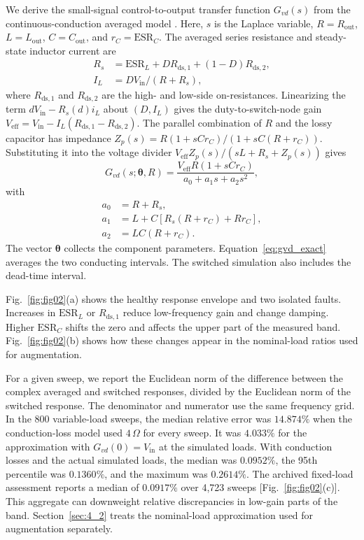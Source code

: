 \documentclass[journal]{IEEEtran}
\begin{document}
We derive the small-signal control-to-output transfer function $G_{vd}(s)$ from the continuous-conduction averaged model \cite{middlebrook1976general,erickson2001fundamentals}. Here, $s$ is the Laplace variable, $R=R_{\mathrm{out}}$, $L=L_{\mathrm{out}}$, $C=C_{\mathrm{out}}$, and $r_C=\mathrm{ESR}_C$. The averaged series resistance and steady-state inductor current are
\begin{align}
R_s &= \mathrm{ESR}_L + D R_{\mathrm{ds},1} + (1-D)R_{\mathrm{ds},2},\\
I_L &= DV_{\mathrm{in}}/(R+R_s),
\end{align}
where $R_{\mathrm{ds},1}$ and $R_{\mathrm{ds},2}$ are the high- and low-side on-resistances. Linearizing the term $dV_{\mathrm{in}}-R_s(d)i_L$ about $(D,I_L)$ gives the duty-to-switch-node gain $V_{\mathrm{eff}}=V_{\mathrm{in}}-I_L(R_{\mathrm{ds},1}-R_{\mathrm{ds},2})$. The parallel combination of $R$ and the lossy capacitor has impedance $Z_p(s)=R(1+sCr_C)/(1+sC(R+r_C))$. Substituting it into the voltage divider $V_{\mathrm{eff}} Z_p(s)/(sL+R_s+Z_p(s))$ gives
\begin{equation}
\label{eq:gvd_exact}
G_{vd}(s;\boldsymbol{\theta},R)
=\frac{V_{\mathrm{eff}} R(1+sCr_C)}
{a_0+a_1s+a_2s^2},
\end{equation}
with
\begin{align*}
a_0 &= R+R_s,\\
a_1 &= L+C[R_s(R+r_C)+Rr_C],\\
a_2 &= LC(R+r_C).
\end{align*}
The vector $\boldsymbol{\theta}$ collects the component parameters. Equation~\eqref{eq:gvd_exact} averages the two conducting intervals. The switched simulation also includes the dead-time interval.

Fig.~\ref{fig:fig02}(a) shows the healthy response envelope and two isolated faults. Increases in $\mathrm{ESR}_L$ or $R_{\mathrm{ds},1}$ reduce low-frequency gain and change damping. Higher $\mathrm{ESR}_C$ shifts the zero and affects the upper part of the measured band. Fig.~\ref{fig:fig02}(b) shows how these changes appear in the nominal-load ratios used for augmentation.

For a given sweep, we report the Euclidean norm of the difference between the complex averaged and switched responses, divided by the Euclidean norm of the switched response. The denominator and numerator use the same frequency grid. In the 800 variable-load sweeps, the median relative error was $14.874\%$ when the conduction-loss model used $4\,\Omega$ for every sweep. It was $4.033\%$ for the approximation with $G_{vd}(0)=V_{\mathrm{in}}$ at the simulated loads. With conduction losses and the actual simulated loads, the median was $0.0952\%$, the 95th percentile was $0.1360\%$, and the maximum was $0.2614\%$. The archived fixed-load assessment reports a median of $0.0917\%$ over 4,723 sweeps [Fig.~\ref{fig:fig02}(c)]. This aggregate can downweight relative discrepancies in low-gain parts of the band. Section~\ref{sec:4_2} treats the nominal-load approximation used for augmentation separately.
\end{document}
